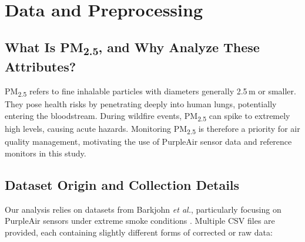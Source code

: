 \documentclass[12pt]{article}                                %
\begin{document}
\section{Data and Preprocessing}
\label{sec:data}           %

\subsection{What Is PM\textsubscript{2.5}, and Why Analyze These Attributes?}   %
PM\textsubscript{2.5} refers to fine inhalable particles with diameters generally 2.5\,\textmu m 
or smaller. They pose health risks by penetrating deeply into human lungs, potentially entering 
the bloodstream. During wildfire events, PM\textsubscript{2.5} can spike to extremely high levels, 
causing acute hazards. Monitoring PM\textsubscript{2.5} is therefore a priority for air quality 
management, motivating the use of PurpleAir sensor data and reference monitors in this study.

\subsection{Dataset Origin and Collection Details}    %
Our analysis relies on datasets from Barkjohn \emph{et al.}, particularly focusing on PurpleAir 
sensors under extreme smoke conditions \cite{Barkjohn2022Sensors}. Multiple CSV files are provided, 
each containing slightly different forms of corrected or raw data:
\end{document}
